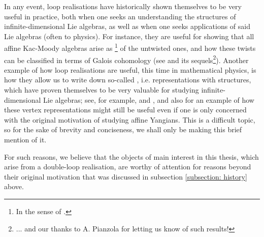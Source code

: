         In any event, loop realisations have historically shown themselves to be very useful in practice, both when one seeks an understanding the structures of infinite-dimensional Lie algebras, as well as when one seeks applications of said Lie algebras (often to physics). For instance, they are useful for showing that all affine Kac-Moody algebras arise as \footnote{In the sense of \cite[Chapter 8]{kac_infinite_dimensional_lie_algebras}.} of the untwisted ones, and how these twists can be classified in terms of Galois cohomology (see \cite{pianzola_vanishing_of_H1_of_dedekind_rings} and its sequels\footnote{... and our thanks to A. Pianzola for letting us know of such results!}). Another example of how loop realisations are useful, this time in mathematical physics, is how they allow us to write down so-called , i.e. representations with  structures, which have proven themselves to be very valuable for studying infinite-dimensional Lie algebras; see, for example, \cite[Chapter 14]{kac_infinite_dimensional_lie_algebras} and \cite{berman_billig_szmigielski_VOAs_and_toroidal_lie_algebras}, and also \cite{guay_regelskis_wendlandt_affine_yangian_vertex_representations_and_PBW} for an example of how these vertex representations might still be useful even if one is only concerned with the original motivation of studying affine Yangians. This is a difficult topic, so for the sake of brevity and conciseness, we shall only be making this brief mention of it.
        
        For such reasons, we believe that the objects of main interest in this thesis, which arise from a double-loop realisation, are worthy of attention for reasons beyond their original motivation that was discussed in subsection \ref{subsection: history} above.